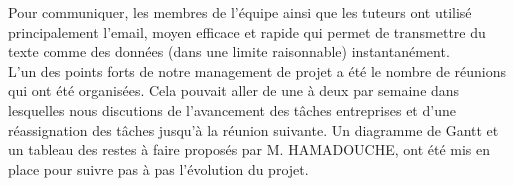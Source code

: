 Pour communiquer, les membres de l'équipe ainsi que les tuteurs ont utilisé principalement l'email, moyen efficace et rapide qui permet de transmettre du texte comme des données (dans une limite raisonnable) instantanément.\\
L'un des points forts de notre management de projet a été le nombre de réunions qui ont été organisées. Cela pouvait aller de une à deux par semaine dans lesquelles nous discutions de l'avancement des tâches entreprises et d'une réassignation des tâches jusqu'à la réunion suivante. Un diagramme de Gantt et un tableau des restes à faire proposés par M. HAMADOUCHE, ont été mis en place pour suivre pas à pas l'évolution du projet.